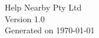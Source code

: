\thispagestyle{empty}
\begin{center}
\vspace*{4cm}

{\Huge Help Nearby Pty Ltd}\\[1.5cm]

{\large Version 1.0}\\[0.5cm]
{\large Generated on \today}

\end{center}

\newpage
